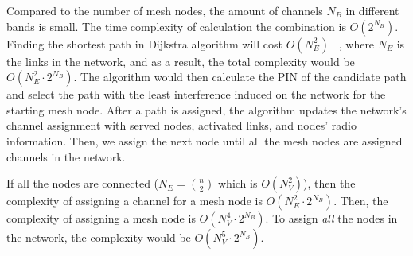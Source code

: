 Compared to the number of mesh nodes, the amount of channels $N_B$ in
different bands is small. The time complexity of calculation the combination
is $O(2^{N_B})$. Finding the shortest path in Dijkstra algorithm will
cost $O(N_E^2)$ ~\cite{golden1976shortest}, where $N_E$ is the links in the
network, and as a result, the total complexity would be $O(N_E^2\cdot 2^{N_B})$.
The algorithm would then calculate the PIN of the candidate path and select the path
with the least interference induced on the network for the starting mesh node.
After a path is assigned, the algorithm updates the network's channel assignment
with served nodes, activated links, and nodes' radio information. Then,
we assign the next node until all the mesh nodes are assigned channels in the
network.

If all the nodes are connected ($N_E={n \choose 2}$ which is $O(N_V^2)$), 
then the complexity of assigning a channel for a mesh node is $O(N_E^2\cdot2^{N_B})$. 
Then, the complexity of assigning a mesh node is $O(N_V^4\cdot2^{N_B})$.
To assign {\it all} the nodes in the network, the complexity would 
be $O(N_V^5\cdot2^{N_B})$.


